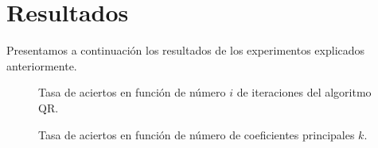 \documentclass[a4paper,10pt,twoside]{article}
\begin{document}








\section{Resultados}


Presentamos a continuación los resultados de los experimentos explicados anteriormente.

\begin{figure}[H]
  \centering
  
  \caption{Tasa de aciertos en función de número $i$ de iteraciones del algoritmo QR.}
  \label{tasas-vs-iteraciones}
\end{figure}

\begin{figure}[H]
  \centering
  
  \caption{Tasa de aciertos en función de número de coeficientes principales $k$.}
  \label{tasas-vs-k}
\end{figure}
\end{document}
